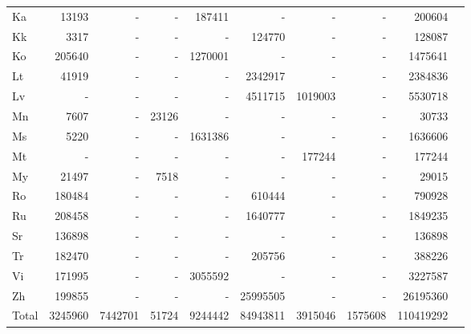 \documentclass[11pt,a4paper]{article}
\newcommand{\dataset}{PC32\xspace}
\begin{document}
\begin{table*}[htb]
\begin{tabular}{lrrrrrrrrr}
Ka   & 13193  & -        & -      & 187411        & -        & -         &        -                    & 200604    \\ 
Kk   & 3317   & -        & -      & -             & 124770   & -         &         -                   & 128087    \\ 
Ko   & 205640 & -        & -      & 1270001       & -        & -         &         -                   & 1475641   \\ 
Lt   & 41919  & -        & -      & -             & 2342917  & -         &        -                    & 2384836   \\ 
Lv   & -      & -        & -      & -             & 4511715  & 1019003   &        -                    & 5530718   \\ 
Mn   & 7607   & -        & 23126  & -             & -        & -         &         -                   & 30733     \\ 
Ms   & 5220   & -        & -      & 1631386       & -        & -         &        -                    & 1636606   \\ 
Mt   & -      & -        & -      & -             & -        & 177244    &        -                    & 177244    \\ 
My   & 21497  & -        & 7518   & -             & -        & -         &        -                    & 29015     \\ 
Ro   & 180484 & -        & -      & -             & 610444   & -         &          -                  & 790928    \\ 
Ru   & 208458 & -        & -      & -             & 1640777  & -         &          -                  & 1849235   \\ 
Sr   & 136898 & -        & -      & -             & -        & -         &          -                 & 136898    \\ 
Tr   & 182470 & -        & -      & -             & 205756   & -         &          -                  & 388226    \\ 
Vi   & 171995 & -        & -      & 3055592       & -        & -         &         -                  & 3227587   \\ 
Zh   & 199855 & -        & -      & -             & 25995505 & -         &        -                    & 26195360  \\
Total   & 3245960 & 7442701        & 51724      & 9244442             & 84943811 & 3915046         &    1575608      & 110419292  \\
\bottomrule

\end{tabular}
\caption{Statistics of the dataset \dataset for pre-training. Each entry shows the number of parallel sentence pairs between English and other language X.  }
\label{table-data-description}


\end{table*}
  
\end{document}

